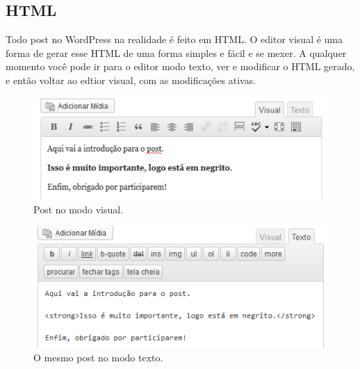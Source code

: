\documentclass[12pt,onecolumn]{article}
\begin{document}
	\subsection{HTML}
		Todo post no WordPress na realidade é feito em HTML. O editor visual é uma
		forma de gerar esse HTML de uma forma simples e fácil e se mexer. A qualquer 
		momento você pode ir para o editor modo texto, ver e modificar o HTML gerado, 
		e então voltar ao edtior visual, com as modificações ativas.
		\begin{figure}[H]
			\centering
			\includegraphics{html2.png}
			\caption{Post no modo visual.}
		\end{figure}
		\begin{figure}[H]
			\centering
			\includegraphics{html3.png}
			\caption{O mesmo post no modo texto.}
		\end{figure}
\end{document}
